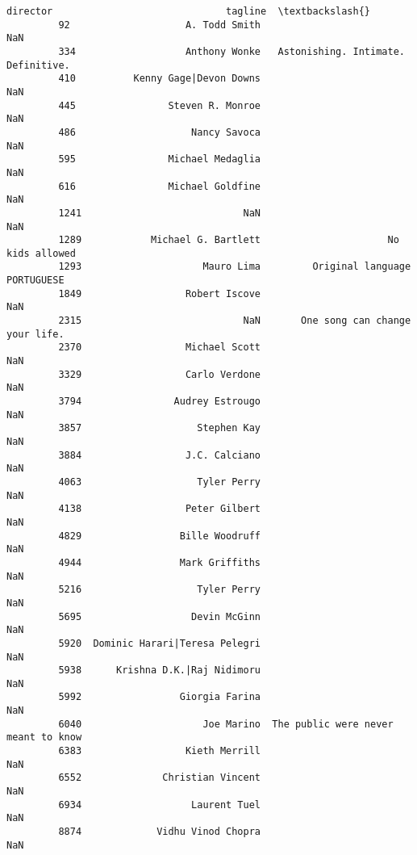 \documentclass[11pt]{article}
\begin{document}
\begin{Verbatim}[commandchars=\\\{\}]
                                    director                              tagline  \textbackslash{}
         92                    A. Todd Smith                                  NaN   
         334                   Anthony Wonke   Astonishing. Intimate. Definitive.   
         410          Kenny Gage|Devon Downs                                  NaN   
         445                Steven R. Monroe                                  NaN   
         486                    Nancy Savoca                                  NaN   
         595                Michael Medaglia                                  NaN   
         616                Michael Goldfine                                  NaN   
         1241                            NaN                                  NaN   
         1289            Michael G. Bartlett                      No kids allowed   
         1293                     Mauro Lima         Original language PORTUGUESE   
         1849                  Robert Iscove                                  NaN   
         2315                            NaN       One song can change your life.   
         2370                  Michael Scott                                  NaN   
         3329                  Carlo Verdone                                  NaN   
         3794                Audrey Estrougo                                  NaN   
         3857                    Stephen Kay                                  NaN   
         3884                  J.C. Calciano                                  NaN   
         4063                    Tyler Perry                                  NaN   
         4138                  Peter Gilbert                                  NaN   
         4829                 Bille Woodruff                                  NaN   
         4944                 Mark Griffiths                                  NaN   
         5216                    Tyler Perry                                  NaN   
         5695                   Devin McGinn                                  NaN   
         5920  Dominic Harari|Teresa Pelegri                                  NaN   
         5938      Krishna D.K.|Raj Nidimoru                                  NaN   
         5992                 Giorgia Farina                                  NaN   
         6040                     Joe Marino  The public were never meant to know   
         6383                  Kieth Merrill                                  NaN   
         6552              Christian Vincent                                  NaN   
         6934                   Laurent Tuel                                  NaN   
         8874             Vidhu Vinod Chopra                                  NaN   
         

\end{Verbatim}
\end{document}
